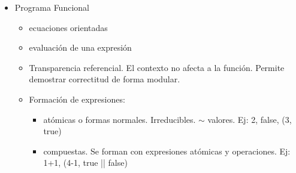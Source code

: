 \documentclass[12pt,a4paper, spanish]{article}
\begin{document}
\begin{itemize}
      \item Programa Funcional
        \begin{itemize}
          \item ecuaciones orientadas
          \item evaluación de una expresión
          \item Transparencia referencial. El contexto no afecta a la función. Permite demostrar correctitud de forma modular.
          \item Formación de expresiones:
          \begin{itemize}
            \item atómicas o formas normales. Irreducibles. $\sim$ valores. Ej: 2, false, (3, true)
            \item compuestas. Se forman con expresiones atómicas y operaciones. Ej: 1+1, (4-1, true || false)
          \end{itemize}
        \end{itemize}
\end{itemize}
\end{document}
